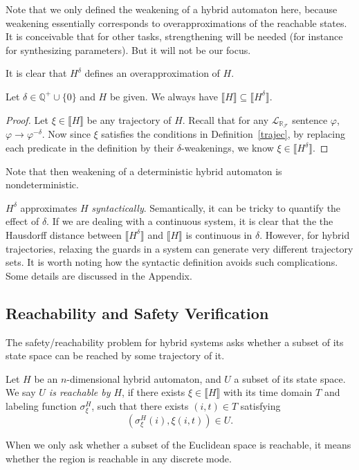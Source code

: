 \documentclass[envcountsect]{llncs}
\newcommand{\lrf}{\mathcal{L}_{\mathbb{R}_{\mathcal{F}}}}
\begin{document}
\begin{remark}
Note that we only defined the weakening of a hybrid automaton here, because
weakening essentially corresponds to overapproximations of the reachable states.
It is conceivable that for other tasks, strengthening will be needed (for
instance for synthesizing parameters). But it will not be our focus.
\end{remark}

It is clear that $H^{\delta}$ defines an overapproximation of $H$.
\begin{proposition} Let $\delta\in\mathbb{Q}^+\cup \{0\}$ and $H$ be given. We
always have $\llbracket H\rrbracket\subseteq \llbracket H^{\delta}\rrbracket.$
\end{proposition}
\begin{proof}
Let $\xi\in \llbracket H\rrbracket$ be any trajectory of $H$. Recall that for
any $\lrf$ sentence $\varphi$, $\varphi\rightarrow\varphi^{-\delta}$. Now since
$\xi$ satisfies the conditions in Definition~\ref{trajec}, by replacing each
predicate in the definition by their $\delta$-weakenings, we know $\xi\in
\llbracket H^{\delta}\rrbracket$.
\end{proof}
Note that then weakening of a deterministic hybrid automaton
is nondeterministic.


\begin{remark}
$H^{\delta}$ approximates $H$ {\em syntactically}. Semantically, it can be
tricky to quantify the effect of $\delta$. If we are dealing with a continuous
system, it is clear that the the Hausdorff distance between $\llbracket
H^{\delta}\rrbracket$ and $\llbracket H\rrbracket$ is continuous in
$\delta$. However, for hybrid trajectories, relaxing the guards in a system can
generate very different trajectory sets. It is worth noting how the syntactic
definition avoids such complications. Some details are discussed in the
Appendix.
\end{remark}


\subsection{Reachability and Safety Verification}

The safety/reachability problem for hybrid systems asks whether a subset of
its state space can be reached by some trajectory of it.
\begin{definition}[Reachability]\label{reachability}
Let $H$ be an $n$-dimensional hybrid automaton, and $U$ a subset of its state
space.  We say {\em $U$ is reachable by $H$}, if there exists $\xi\in\llbracket
H
\rrbracket$ with its time domain $T$ and labeling function
$\sigma_{\xi}^H$, such that there exists $(i,t)\in T$ satisfying
$$(\sigma^H_{\xi}(i), \xi(i,t))\in U.$$
\end{definition}
When we only ask whether a subset of the Euclidean space is reachable, it
means whether the region is reachable in any discrete mode.
\end{document}
